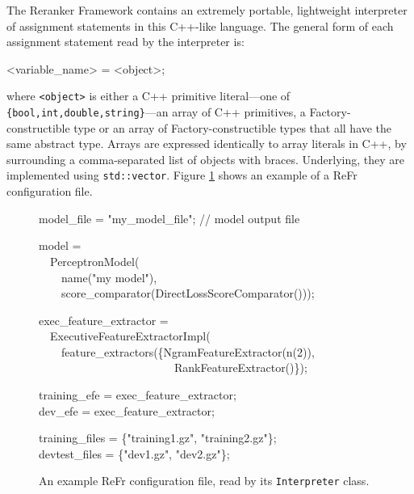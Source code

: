 \documentclass[a4paper]{article}
\newcommand\inlinecode[1]{\scriptsize\texttt{#1}\normalsize}
\let\textquotedbl="
\newenvironment{lyxcode}
{\par\begin{list}{}{
\scriptsize
\setlength{\leftmargin}{0.1in}
\setlength{\rightmargin}{\leftmargin}
\setlength{\listparindent}{0pt}%
\raggedright
\setlength{\itemsep}{0pt}
\setlength{\parsep}{0pt}
\normalfont\ttfamily}%
 \item[]}
{\end{list}}
\begin{document}
The Reranker Framework contains an extremely portable, lightweight
interpreter of assignment statements in this C++-like language.  The
general form of each assignment statement read by the interpreter is:
\begin{lyxcode}
<variable\_name> = <object>;
\end{lyxcode}
\normalsize
where \inlinecode{<object>} is either a C++ primitive literal---one of
\inlinecode{\{bool,int,double,string\}}---an array of C++ primitives, a
Factory-constructible type or an array of Factory-constructible types
that all have the same abstract type.  Arrays are expressed identically to array literals in C++, by surrounding a comma-separated list of objects with braces.  Underlying, they are implemented using \inlinecode{std::vector}. Figure \ref{fig:interpreter-config} shows an example of a ReFr configuration file.


\begin{figure}
\begin{lyxcode}
\scriptsize
model\_file = \textquotedbl my\_model\_file\textquotedbl;  // model output file

model =\\
~~PerceptronModel(\\
~~~~name(\textquotedbl my model\textquotedbl),\\
~~~~score\_comparator(DirectLossScoreComparator()));

exec\_feature\_extractor =\\
~~ExecutiveFeatureExtractorImpl(\\
~~~~feature\_extractors(\{NgramFeatureExtractor(n(2)),\\
~~~~~~~~~~~~~~~~~~~~~~~~RankFeatureExtractor()\});

training\_efe = exec\_feature\_extractor;\\
dev\_efe = exec\_feature\_extractor;

training\_files = \{\textquotedbl training1.gz\textquotedbl,
\textquotedbl training2.gz\textquotedbl\};\\
devtest\_files = \{\textquotedbl dev1.gz\textquotedbl,
\textquotedbl dev2.gz\textquotedbl\};
\normalsize
\end{lyxcode}
\vspace{-0.2in}
\caption{\label{fig:interpreter-config}An example ReFr configuration file, read by its \inlinecode{Interpreter} class.}
\end{figure}

\end{document}

